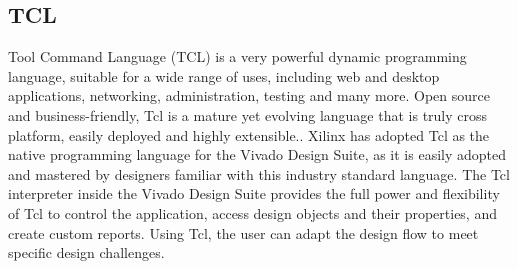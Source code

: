 \subsection{TCL}\label{tcl}
Tool Command Language (TCL) is a very powerful dynamic programming language, suitable for a wide range of uses, including web and desktop applications, networking, administration, testing and many more. Open source and business-friendly, Tcl is a mature yet evolving language that is truly cross platform, easily deployed and highly extensible.\cite{tcl}.
Xilinx has adopted Tcl as the native programming language for the Vivado Design Suite,
as it is easily adopted and mastered by designers familiar with this industry standard
language. The Tcl interpreter inside the Vivado Design Suite provides the full power and
flexibility of Tcl to control the application, access design objects and their properties, and
create custom reports. Using Tcl, the user can adapt the design flow to meet specific design
challenges.

